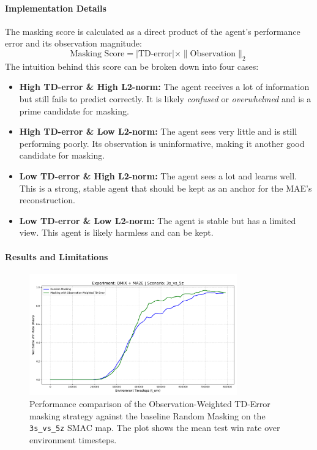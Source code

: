 \paragraph{Implementation Details}
The masking score is calculated as a direct product of the agent's performance error and its observation magnitude:
\begin{equation}
    \text{Masking Score} = |\text{TD-error}| \times \| \text{Observation} \|_2
    \label{eq:obs_weighted_td}
\end{equation}
The intuition behind this score can be broken down into four cases:
\begin{itemize}
    \item \textbf{High TD-error \& High L2-norm:} The agent receives a lot of information but still fails to predict correctly. It is likely \textit{confused} or \textit{overwhelmed} and is a prime candidate for masking.
    \item \textbf{High TD-error \& Low L2-norm:} The agent sees very little and is still performing poorly. Its observation is uninformative, making it another good candidate for masking.
    \item \textbf{Low TD-error \& High L2-norm:} The agent sees a lot and learns well. This is a strong, stable agent that should be kept as an anchor for the MAE's reconstruction.
    \item \textbf{Low TD-error \& Low L2-norm:} The agent is stable but has a limited view. This agent is likely harmless and can be kept.
\end{itemize}

\paragraph{Results and Limitations}


\begin{figure}[h]
    \centering
    \includegraphics[width=0.8\textwidth]{images_pfe/results_li-ma2e/test_battle_won_mean_3s_vs_5z_Observation-Weighted_TD_smoothed.png}
    \caption{Performance comparison of the Observation-Weighted TD-Error masking strategy against the baseline Random Masking on the \texttt{3s\_vs\_5z} SMAC map. The plot shows the mean test win rate over environment timesteps.}
    \label{fig:obs_weighted_vs_random}
\end{figure}

